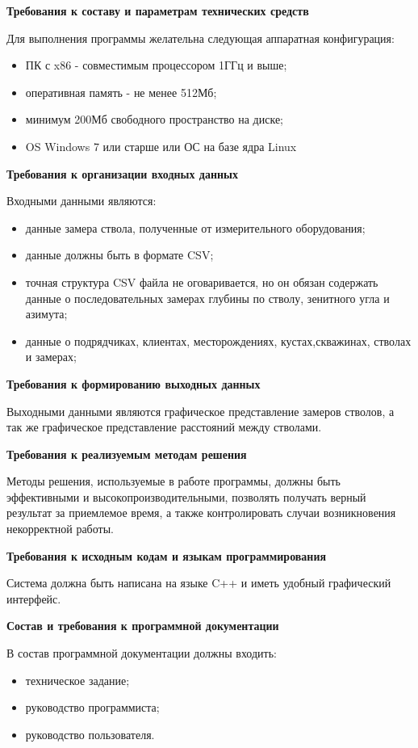 \textbf{Требования к составу и параметрам технических средств}

Для выполнения программы желательна следующая аппаратная конфигурация:

\begin{itemize}
  \item ПК с x86 - совместимым процессором 1ГГц и выше;
  \item оперативная память - не менее 512Мб;
  \item минимум 200Мб свободного пространство на диске;
  \item OS Windows 7 или старше или ОС на базе ядра Linux
\end{itemize}

\textbf{Требования к организации входных данных}

Входными данными являются:
\begin{itemize}
  \item данные замера ствола, полученные от измерительного оборудования;
  \item данные должны быть в формате CSV;
  \item точная структура CSV файла не оговаривается, но он обязан содержать данные о последовательных замерах
    глубины по стволу, зенитного угла и азимута;
  \item данные о подрядчиках, клиентах, месторождениях, кустах,скважинах, стволах и замерах;
\end{itemize}

\textbf{Требования к формированию выходных данных}

Выходными данными являются графическое представление замеров стволов, а так же графическое представление расстояний
между стволами.

\textbf{Требования к реализуемым методам решения}

Методы решения, используемые в работе программы, должны быть эффективными и высокопроизводительными,
позволять получать верный результат за приемлемое время, а также контролировать случаи возникновения некорректной работы.

\textbf{Требования к исходным кодам и языкам программирования}

Система должна быть написана на языке C++ и иметь удобный графический интерфейс.

\textbf{Состав и требования к программной документации}

В состав программной документации должны входить:
\begin{itemize}
  \item техническое задание;
  \item руководство программиста;
  \item руководство пользователя.
\end{itemize}
